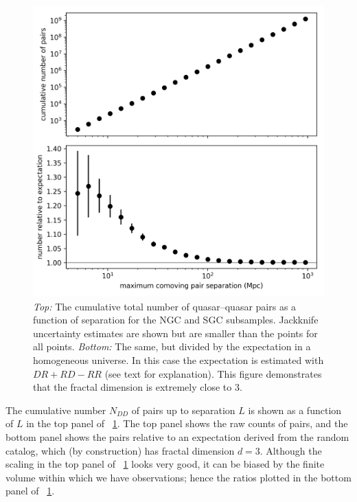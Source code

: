 \documentclass[modern]{aastex631}
\newlength{\figurewidth}
\newcommand{\figref}[1]{\figurename~\ref{#1}}
\begin{document}
\begin{figure}[t!]
  \begin{mdframed}
  \color{captiongray}
  \begin{center}
    \includegraphics[width=\figurewidth]{notebooks/cumulativeDD_DR.png}
  \end{center}
    \caption{\textsl{Top:} The cumulative total number of quasar--quasar pairs as a function of separation for the NGC and SGC subsamples. Jackknife uncertainty estimates are shown but are smaller than the points for all points.
    \textsl{Bottom:} The same, but divided by the expectation in a homogeneous universe.
    In this case the expectation is estimated with $DR + RD - RR$ (see text for explanation).
    This figure demonstrates that the fractal dimension is extremely close to $3$.\label{fig:cumulative}}
  \end{mdframed}
\end{figure}
The cumulative number $N_{DD}$ of pairs up to separation $L$ is shown as a function of $L$ in the top panel of \figref{fig:cumulative}.
The top panel shows the raw counts of pairs, and the bottom panel shows the pairs relative to an expectation derived from the random catalog, which (by construction) has fractal dimension $d=3$.
Although the scaling in the top panel of \figref{fig:cumulative} looks very good, it can be biased by the finite volume within which we have observations; hence the ratios plotted in the bottom panel of \figref{fig:cumulative}.
\end{document}
